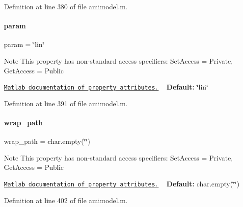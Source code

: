 Definition at line 380 of file amimodel.\+m.

\mbox{\label{classamimodel_a51f20d6b1b54a2eee3be0e8adc96a0ae}} 
\paragraph{\texorpdfstring{param}{param}}
{\footnotesize\ttfamily param = \char`\"{}lin\char`\"{}}

\begin{DoxyNote}{Note}
This property has non-\/standard access specifiers\+: {\ttfamily Set\+Access = Private, Get\+Access = Public} 

\href{http://www.mathworks.com/help/matlab/matlab_oop/property-attributes.html}{\tt Matlab documentation of property attributes.} ~\newline
{\bfseries Default\+:} \char`\"{}lin\char`\"{} 
\end{DoxyNote}


Definition at line 391 of file amimodel.\+m.

\mbox{\label{classamimodel_a0b316a20054ba282555674d939a82406}} 
\paragraph{\texorpdfstring{wrap\+\_\+path}{wrap\_path}}
{\footnotesize\ttfamily wrap\+\_\+path = char.\+empty(\char`\"{}\char`\"{})}

\begin{DoxyNote}{Note}
This property has non-\/standard access specifiers\+: {\ttfamily Set\+Access = Private, Get\+Access = Public} 

\href{http://www.mathworks.com/help/matlab/matlab_oop/property-attributes.html}{\tt Matlab documentation of property attributes.} ~\newline
{\bfseries Default\+:} char.\+empty(\char`\"{}\char`\"{}) 
\end{DoxyNote}


Definition at line 402 of file amimodel.\+m.

\mbox{\label{classamimodel_a8d2e824e03e32034b634a7c48f2a26c6}} 
